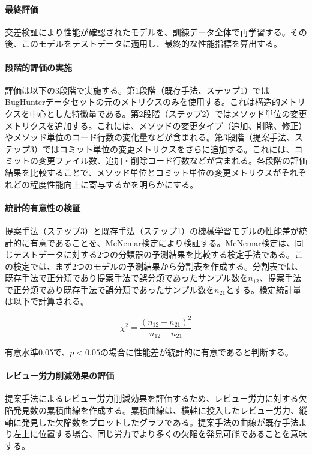 \paragraph{最終評価}
交差検証により性能が確認されたモデルを、訓練データ全体で再学習する。その後、このモデルをテストデータに適用し、最終的な性能指標を算出する。

\paragraph{段階的評価の実施}
評価は以下の3段階で実施する。第1段階（既存手法、ステップ1）ではBugHunterデータセットの元のメトリクスのみを使用する。これは構造的メトリクスを中心とした特徴量である。第2段階（ステップ2）ではメソッド単位の変更メトリクスを追加する。これには、メソッドの変更タイプ（追加、削除、修正）やメソッド単位のコード行数の変化量などが含まれる。第3段階（提案手法、ステップ3）ではコミット単位の変更メトリクスをさらに追加する。これには、コミットの変更ファイル数、追加・削除コード行数などが含まれる。各段階の評価結果を比較することで、メソッド単位とコミット単位の変更メトリクスがそれぞれどの程度性能向上に寄与するかを明らかにする。

\paragraph{統計的有意性の検証}
提案手法（ステップ3）と既存手法（ステップ1）の機械学習モデルの性能差が統計的に有意であることを、McNemar検定により検証する。McNemar検定は、同じテストデータに対する2つの分類器の予測結果を比較する検定手法である。この検定では、まず2つのモデルの予測結果から分割表を作成する。分割表では、既存手法で正分類であり提案手法で誤分類であったサンプル数を$n_{12}$、提案手法で正分類であり既存手法で誤分類であったサンプル数を$n_{21}$とする。検定統計量は以下で計算される。

\[
\chi^2 = \frac{(n_{12} - n_{21})^2}{n_{12} + n_{21}}
\]

有意水準0.05で、$p < 0.05$の場合に性能差が統計的に有意であると判断する。

\paragraph{レビュー労力削減効果の評価}
提案手法によるレビュー労力削減効果を評価するため、レビュー労力に対する欠陥発見数の累積曲線を作成する。累積曲線は、横軸に投入したレビュー労力、縦軸に発見した欠陥数をプロットしたグラフである。提案手法の曲線が既存手法より左上に位置する場合、同じ労力でより多くの欠陥を発見可能であることを意味する。

